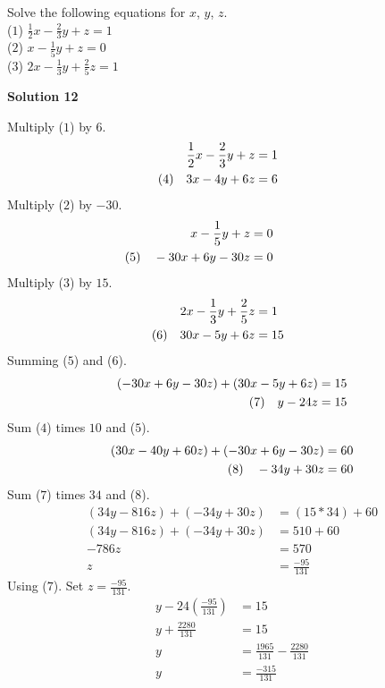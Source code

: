 \documentclass[6pt]{article}
\begin{document}
\begin{tcolorbox}[title=Problem 12, breakable]
    Solve the following equations for $x$, $y$, $z$. \\
    ($1$) $\frac{1}{2}x - \frac{2}{3}y + z = 1$ \\
    ($2$) $x - \frac{1}{5}y + z = 0$ \\
    ($3$) $2x - \frac{1}{3}y + \frac{2}{5}z = 1$
\end{tcolorbox}

\textbf{Solution 12}

Multiply ($1$) by $6$.
\begin{align*}
    \frac{1}{2}x - \frac{2}{3}y + z &= 1 \\
    \hspace{-2cm}\text{(4)}\quad 3x - 4y + 6z &= 6
\end{align*}
Multiply ($2$) by $-30$.
\begin{align*}
    x - \frac{1}{5}y + z &= 0 \\
    \hspace{-2cm}\text{(5)}\quad -30x + 6y - 30z &= 0
\end{align*}
Multiply ($3$) by $15$.
\begin{align*}
    2x - \frac{1}{3}y + \frac{2}{5}z &= 1 \\
    \hspace{-2cm}\text{(6)}\quad 30x - 5y + 6z &= 15
\end{align*}
Summing ($5$) and ($6$).
\begin{align*}
    (-30x + 6y - 30z) + (30x - 5y + 6z ) &= 15 \\
    \hspace{-2cm}\text{(7)}\quad y - 24z &= 15 
\end{align*}
Sum ($4$) times $10$ and ($5$).
\begin{align*}
    (30x - 40y + 60z) + (-30x + 6y - 30z) &= 60 \\
    \hspace{-2cm}\text{(8)}\quad -34y + 30z &= 60
\end{align*}
Sum ($7$) times $34$ and ($8$).
\begin{align*}
    (34y - 816z) + (-34y + 30z) &= (15 * 34) + 60 \\
    (34y - 816z) + (-34y + 30z) &= 510 + 60 \\
    -786z &= 570 \\
    z &= \frac{-95}{131}
\end{align*}
Using ($7$). Set $z = \frac{-95}{131}$.
\begin{align*}
    y - 24(\frac{-95}{131}) &= 15 \\
    y + \frac{2280}{131} &= 15 \\
    y &= \frac{1965}{131} - \frac{2280}{131} \\
    y &= \frac{-315}{131}
\end{align*}
\end{document}
